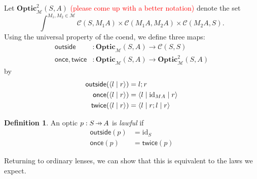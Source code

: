\documentclass[11pt,letterpaper]{article}
\theoremstyle{plain}
\theoremstyle{definition}
\newtheorem{definition}[theorem]{Definition}
\newcommand{\C}{\mathscr{C}}
\newcommand{\M}{\mathscr{M}}
\newcommand{\Optic}{\mathbf{Optic}}
\newcommand{\Twoptic}{\mathbf{Optic}^2}
\newcommand{\id}{\mathrm{id}}
\newcommand{\rep}[2]{{\ensuremath \left\langle #1 \mid #2 \right\rangle}}
\newcommand{\repthree}[3]{{\ensuremath \langle #1 \mid #2 \mid #3 \rangle}}
\newcommand{\outside}{\mathsf{outside}}
\newcommand{\once}{\mathsf{once}}
\newcommand{\twice}{\mathsf{twice}}
\newcommand{\hto}{\ensuremath{\,\mathaccent\shortmid\rightarrow\,}}
\newcommand{\todo}[1]{\textcolor{red}{\small #1}}
\begin{document}
Let $\Twoptic_\M(S, A)$ \todo{(please come up with a better notation)} denote the set \[ \int^{M_1, M_2 \in \M} \C(S, M_1 A) \times \C(M_1 A, M_2 A) \times \C(M_2 A, S). \]
Using the universal property of the coend, we define three maps:
\begin{align*}
  \outside &: \Optic_\M(S, A) \to \C(S, S) \\
  \once, \twice &: \Optic_\M(S, A) \to \Twoptic_\M(S, A)
\end{align*}
by
\begin{align*}
  \outside(\rep{l}{r}) &= l;r \\
  \once(\rep{l}{r}) &= \repthree{l}{\id_{MA}}{r} \\
  \twice(\rep{l}{r}) &= \repthree{l}{r;l}{r}
\end{align*}

\begin{definition}
  An optic $p : S \hto A$ is \emph{lawful} if
  \begin{align*}
    \outside(p) &= \id_S \\
    \once(p) &= \twice(p)
  \end{align*}
\end{definition}

Returning to ordinary lenses, we can show that this is equivalent to the laws we expect.
 
\end{document}
